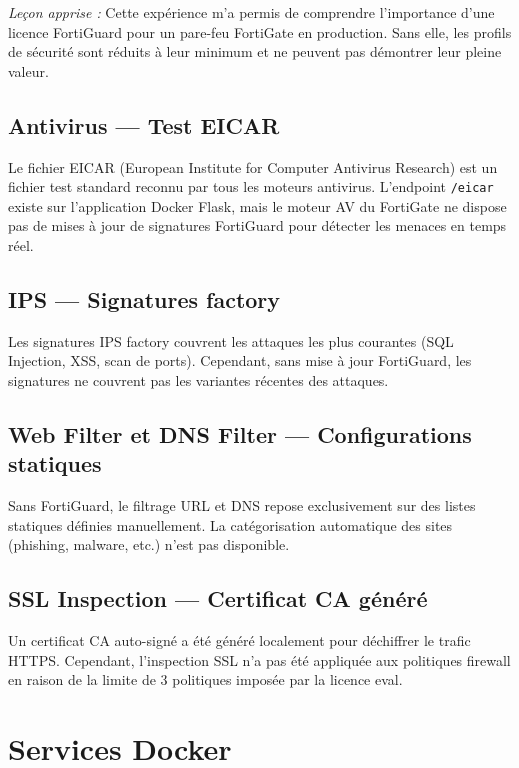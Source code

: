 \noindent\textit{Leçon apprise :} Cette expérience m'a permis de comprendre l'importance d'une licence FortiGuard pour un pare-feu FortiGate en production. Sans elle, les profils de sécurité sont réduits à leur minimum et ne peuvent pas démontrer leur pleine valeur.

\subsection{Antivirus --- Test EICAR}

Le fichier EICAR (European Institute for Computer Antivirus Research) est un fichier test standard reconnu par tous les moteurs antivirus. L'endpoint \texttt{/eicar} existe sur l'application Docker Flask, mais le moteur AV du FortiGate ne dispose pas de mises à jour de signatures FortiGuard pour détecter les menaces en temps réel.

\subsection{IPS --- Signatures factory}

Les signatures IPS factory couvrent les attaques les plus courantes (SQL Injection, XSS, scan de ports). Cependant, sans mise à jour FortiGuard, les signatures ne couvrent pas les variantes récentes des attaques.

\subsection{Web Filter et DNS Filter --- Configurations statiques}

Sans FortiGuard, le filtrage URL et DNS repose exclusivement sur des listes statiques définies manuellement. La catégorisation automatique des sites (phishing, malware, etc.) n'est pas disponible.

\subsection{SSL Inspection --- Certificat CA généré}

Un certificat CA auto-signé a été généré localement pour déchiffrer le trafic HTTPS. Cependant, l'inspection SSL n'a pas été appliquée aux politiques firewall en raison de la limite de 3 politiques imposée par la licence eval.

\section{Services Docker}

